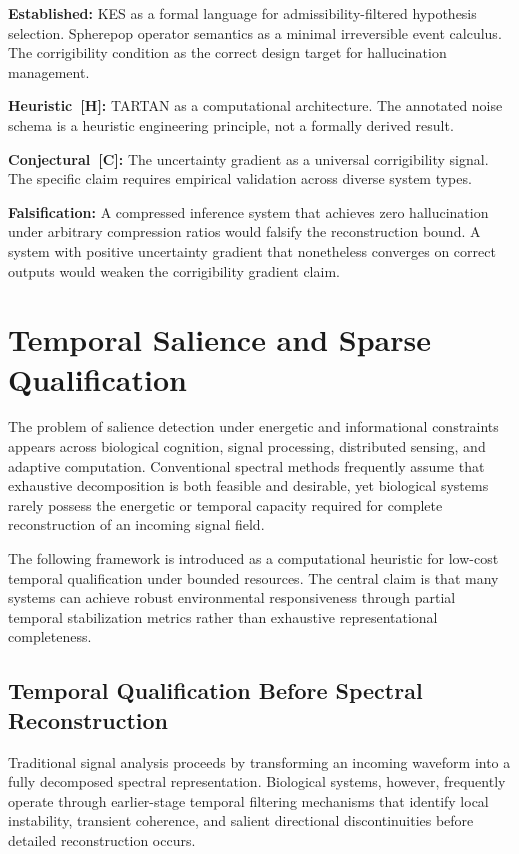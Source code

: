 \begin{constraintboundary}
\textbf{Established:} KES as a formal language for admissibility-filtered hypothesis
selection. Spherepop operator semantics as a minimal irreversible event calculus.
The corrigibility condition as the correct design target for hallucination management.

\textbf{Heuristic~[H]:} TARTAN as a computational architecture. The annotated
noise schema is a heuristic engineering principle, not a formally derived result.

\textbf{Conjectural~[C]:} The uncertainty gradient as a universal corrigibility
signal. The specific claim requires empirical validation across diverse system types.

\textbf{Falsification:} A compressed inference system that achieves zero hallucination
under arbitrary compression ratios would falsify the reconstruction bound. A system
with positive uncertainty gradient that nonetheless converges on correct outputs
would weaken the corrigibility gradient claim.
\end{constraintboundary}

\section{Temporal Salience and Sparse Qualification}
\label{sec:marine}

The problem of salience detection under energetic and informational constraints
appears across biological cognition, signal processing, distributed sensing, and
adaptive computation. Conventional spectral methods frequently assume that
exhaustive decomposition is both feasible and desirable, yet biological systems
rarely possess the energetic or temporal capacity required for complete
reconstruction of an incoming signal field.

\claimH The following framework is introduced as a computational heuristic for
low-cost temporal qualification under bounded resources. The central claim is that
many systems can achieve robust environmental responsiveness through partial temporal
stabilization metrics rather than exhaustive representational completeness.

\subsection{Temporal Qualification Before Spectral Reconstruction}

Traditional signal analysis proceeds by transforming an incoming waveform into a
fully decomposed spectral representation. Biological systems, however, frequently
operate through earlier-stage temporal filtering mechanisms that identify local
instability, transient coherence, and salient directional discontinuities before
detailed reconstruction occurs.


